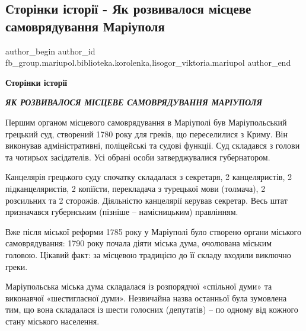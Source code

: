  
 
 
 
 

\subsection{Сторінки історії - Як розвивалося місцеве самоврядування Маріуполя}
\label{sec:06_12_2022.fb.fb_group.mariupol.biblioteka.korolenka.1.stor_nki__stor____y}
 
\ifcmt
 author_begin
   author_id fb_group.mariupol.biblioteka.korolenka,lisogor_viktoria.mariupol
 author_end
\fi

\textbf{Сторінки історії}

\textbf{\emph{ЯК РОЗВИВАЛОСЯ МІСЦЕВЕ САМОВРЯДУВАННЯ МАРІУПОЛЯ}}

Першим органом місцевого самоврядування в Маріуполі був Маріупольський грецький
суд, створений 1780 року для греків, що переселилися з Криму. Він виконував
адміністративні, поліцейські та судові функції. Суд складався з голови та
чотирьох засідателів. Усі обрані особи затверджувалися губернатором.

Канцелярія грецького суду спочатку складалася з секретаря, 2 канцеляристів, 2
підканцеляристів, 2 копіїсти, перекладача з турецької мови (толмача), 2
розсильних та 2 сторожів. Діяльністю канцелярії керував секретар. Весь штат
призначався губернським (пізніше – намісницьким) правлінням.

Вже після міської реформи 1785 року у Маріуполі було створено органи міського
самоврядування: 1790 року почала діяти міська дума, очолювана міським головою.
Цікавий факт: за місцевою традицією до її складу входили виключно греки.

Маріупольська міська дума складалася із розпорядчої «спільної думи» та
виконавчої «шестигласної думи». Незвичайна назва останньої була зумовлена тим,
що вона складалася із шести голосних (депутатів) – по одному від кожного стану
міського населення.

